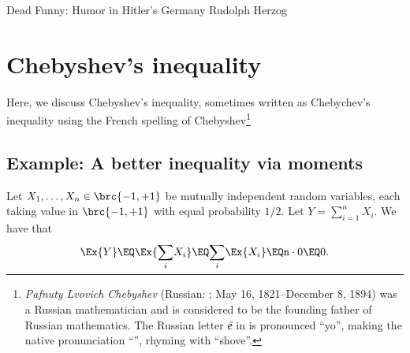 \makeatletter
{}
\makeatother
\ifx\bookMode\undefined%
\fi



\ChapterPrefix{}
\ChapterGen{}

\medskip

%
{Dead Funny: Humor in Hitler's Germany}%
{Rudolph Herzog}




\section{Chebyshev's inequality}

Here, we discuss Chebyshev's inequality, sometimes written as Chebychev's
inequality using the French spelling of Chebyshev\footnote{\emph{Pafnuty
      Lvovich Chebyshev} (Russian: ; May 16, 1821--December 8, 1894) was a Russian
   mathematician and is considered to be the founding father of Russian
   mathematics. The Russian letter \emph{ё} in  is
   pronounced ``yo'', making the native pronunciation
   ``'', rhyming with ``shove''.}


\subsection{Example: A better inequality via moments}


Let $X_1, \ldots, X_n \in \brc{-1,+1}$ be mutually independent random variables,
each {taking value} in $\brc{-1,+1}$ with equal probability $1/2$. Let
$Y= \sum_{i=1}^n X_i$. We have that
\begin{equation*}
    \Ex{Y\bigr.}%
    \EQ%
    \Ex{\Bigl. \smash{\sum_i} X_i}%
    \EQ%
    \smash{\sum_i} \Ex{X_i \bigr.}%
    \EQ%
    n \cdot 0%
    \EQ
    0.
\end{equation*}


